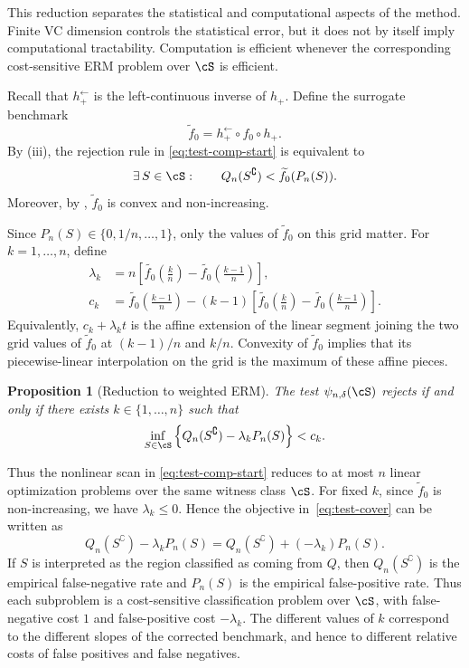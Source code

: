 \documentclass[english]{article}
\theoremstyle{plain}
\newtheorem{proposition}{Proposition}[section]
\theoremstyle{definition}
\newcommand{\hinv}{h_+^{\leftarrow}}
\newcommand{\fnull}{f_0}
\begin{document}
This reduction separates the statistical and computational aspects of the
method. Finite VC dimension controls the statistical error, but it does not by
itself imply computational tractability. Computation is efficient whenever the
corresponding cost-sensitive ERM problem over \(\cS\) is efficient.

Recall that \(\hinv\) is the left-continuous inverse of \(h_+\). Define the
surrogate benchmark
\[
\widetilde \fnull
=
\hinv\circ \fnull\circ h_+.
\]
By (iii), the rejection rule in
\eqref{eq:test-comp-start} is equivalent to
\[
\exists\,S\in\cS:
\qquad
Q_n(S^\complement)<\widetilde\fnull(P_n(S)).
\]
Moreover, by , \(\widetilde\fnull\) is convex and
non-increasing.

Since \(P_n(S)\in\{0,1/n,\ldots,1\}\), only the values of
\(\widetilde\fnull\) on this grid matter. For \(k=1,\ldots,n\), define
\begin{align}
\label{eq:intercept_and_slope}
\lambda_k
&=
n\left[
\widetilde{\fnull}\left(\frac{k}{n}\right)
-
\widetilde{\fnull}\left(\frac{k-1}{n}\right)
\right],
\\
c_k
&=
\widetilde{\fnull}\left(\frac{k-1}{n}\right)
-
(k-1)
\left[
\widetilde{\fnull}\left(\frac{k}{n}\right)
-
\widetilde{\fnull}\left(\frac{k-1}{n}\right)
\right].
\nonumber
\end{align}
Equivalently, \(c_k+\lambda_k t\) is the affine extension of the linear segment
joining the two grid values of \(\widetilde\fnull\) at \((k-1)/n\) and \(k/n\).
Convexity of \(\widetilde\fnull\) implies that its piecewise-linear
interpolation on the grid is the maximum of these affine pieces.

\begin{proposition}[Reduction to weighted ERM]\label{prop:computation-main}
The test \(\psi_{n,\delta}(\cS)\) rejects if and only if there exists
\(k\in\{1,\ldots,n\}\) such that
\begin{equation}
\label{eq:test-cover}
\inf_{S\in\cS}
\left\{
Q_n(S^\complement)-\lambda_k P_n(S)
\right\}
<
c_k.
\end{equation}
\end{proposition}

Thus the nonlinear scan in \eqref{eq:test-comp-start} reduces to at most \(n\)
linear optimization problems over the same witness class \(\cS\). For fixed
\(k\), since \(\widetilde\fnull\) is non-increasing, we have
\(\lambda_k\leqslant 0\). Hence the objective in~\eqref{eq:test-cover} can be
written as
\[
Q_n(S^\complement)-\lambda_k P_n(S)
=
Q_n(S^\complement)+(-\lambda_k)P_n(S).
\]
If \(S\) is interpreted as the region classified as coming from \(Q\), then
\(Q_n(S^\complement)\) is the empirical false-negative rate and \(P_n(S)\) is
the empirical false-positive rate. Thus each subproblem is a cost-sensitive
classification problem over \(\cS\), with false-negative cost \(1\) and
false-positive cost \(-\lambda_k\). The different values of \(k\) correspond to
the different slopes of the corrected benchmark, and hence to different
relative costs of false positives and false negatives.
\end{document}

